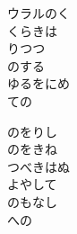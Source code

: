 \documentclass[10pt,b5j]{tarticle} %
\begin{document}
\begin{enumerate}
\begin{minipage}[c]{\blocksize}
        \vspace{\linespace}
        \item
        ウラルのく\\
        くらきは\\
        りつつ\\
        のする\\
        ゆるをにめ\\
        ての
        
        \vspace{\linespace}
        \item
        のをりし\\
        のをきね\\
        つべきはぬ\\
        よやして\\
        のもなし\\
        への
    
    \end{minipage}
\end{enumerate} %
\end{document}
